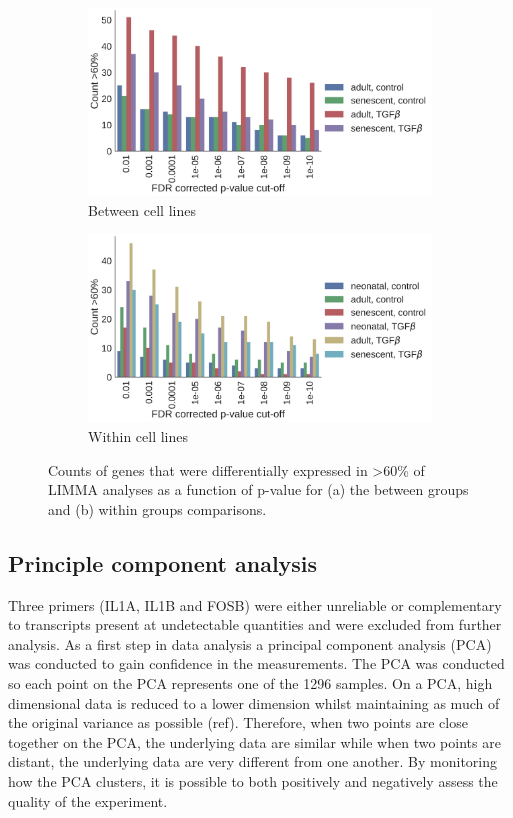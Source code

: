 \documentclass[alpha-refs]{wiley-article}
\begin{document}
\begin{figure}
	\begin{subfigure}{0.45\linewidth}
		\includegraphics[width=\linewidth]{LIMMA09_2018/SavedObjects/between_pvalue_counts}
		\caption{Between cell lines}
		\label{fig:pvalues:between}
	\end{subfigure}
	\begin{subfigure}{0.45\linewidth}
		\includegraphics[width=\linewidth]{LIMMA09_2018/SavedObjects/within_pvalue_counts}
		\caption{Within cell lines}
		\label{fig:pvalues:within}
	\end{subfigure}
	\caption{Counts of genes that were differentially expressed in >60\% of LIMMA analyses as a function of p-value for (a) the between groups and (b) within groups comparisons.}
	\label{fig:pvalues}
\end{figure}
%
\subsection{Principle component analysis}
Three primers (IL1A, IL1B and FOSB) were either unreliable or complementary to transcripts present at undetectable quantities and were excluded from further analysis. As a first step in data analysis a principal component analysis (PCA) was conducted to gain confidence in the measurements. The PCA was conducted so each point on the PCA represents one of the 1296 samples. On a PCA, high dimensional data is reduced to a lower dimension whilst maintaining as much of the original variance as possible (ref). Therefore, when two points are close together on the PCA, the underlying data are similar while when two points are distant, the underlying data are very different from one another. By monitoring how the PCA clusters, it is possible to both positively and negatively assess the quality of the experiment. 
\end{document}
